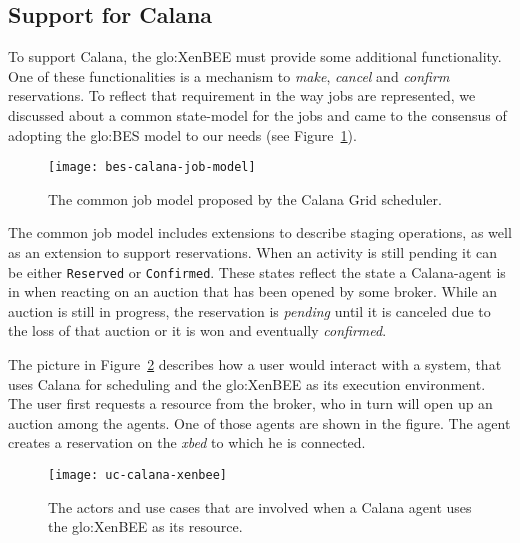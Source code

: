 \subsection{Support for Calana}
\label{sec:calana-support}

To  support  Calana, the  \gls{glo:XenBEE}  must  provide some  additional
functionality. One of these functionalities is a mechanism to \emph{make},
\emph{cancel}   and   \emph{confirm}   reservations.   To   reflect   that
requirement in the  way jobs are represented, we  discussed about a common
state-model  for  the jobs  and  came to  the  consensus  of adopting  the
\gls{glo:BES}         model        to        our         needs        (see
Figure~\ref{fig:bes-calana-job-model}).

\begin{figure}[h]
  \centering
  \texttt{[image: bes-calana-job-model]}
  \caption[Calana Job Model]{The common job model proposed by the Calana
    Grid scheduler.}
  \label{fig:bes-calana-job-model}
\end{figure}

The common  job model includes extensions to  describe staging operations,
as well as an extension to support reservations. When an activity is still
pending it  can be  either \texttt{Reserved} or  \texttt{Confirmed}. These
states reflect the state a Calana-agent  is in when reacting on an auction
that  has  been opened  by  some  broker. While  an  auction  is still  in
progress, the  reservation is \emph{pending}  until it is canceled  due to
the loss of  that auction or it is won  and eventually \emph{confirmed}.


\bigskip

The picture  in Figure~\ref{fig:calana-xenbee} describes how  a user would
interact  with  a  system,  that   uses  Calana  for  scheduling  and  the
\gls{glo:XenBEE} as  its execution environment. The user  first requests a
resource from  the broker, who in turn  will open up an  auction among the
agents.  One of those agents are  shown in the figure. The agent creates a
reservation on the \emph{xbed} to which he is connected.

\begin{figure}[htbp]
  \centering
  \texttt{[image: uc-calana-xenbee]}
  \caption[Calana and  XenBEE]{The actors and use cases  that are involved
    when a Calana agent uses the \gls{glo:XenBEE} as its resource.}
  \label{fig:calana-xenbee}
\end{figure}

